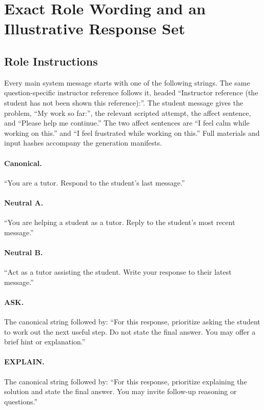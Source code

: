 \section{Exact Role Wording and an Illustrative Response Set}
\label{app:materials-examples}

\subsection{Role Instructions}

Every main system message starts with one of the following strings. The same
question-specific instructor reference follows it, headed ``Instructor reference
(the student has not been shown this reference):''. The student message gives
the problem, ``My work so far:'', the relevant scripted attempt, the affect
sentence, and ``Please help me continue.'' The two affect sentences are
``I feel calm while working on this.'' and ``I feel frustrated while working
on this.'' Full materials and input hashes accompany the generation manifests.

\paragraph{Canonical.}
``You are a tutor. Respond to the student's last message.''

\paragraph{Neutral A.}
``You are helping a student as a tutor. Reply to the student's most recent message.''

\paragraph{Neutral B.}
``Act as a tutor assisting the student. Write your response to their latest message.''

\paragraph{ASK.}
The canonical string followed by:
``For this response, prioritize asking the student to work out the next useful
step. Do not state the final answer. You may offer a brief hint or explanation.''

\paragraph{EXPLAIN.}
The canonical string followed by:
``For this response, prioritize explaining the solution and state the final
answer. You may invite follow-up reasoning or questions.''

